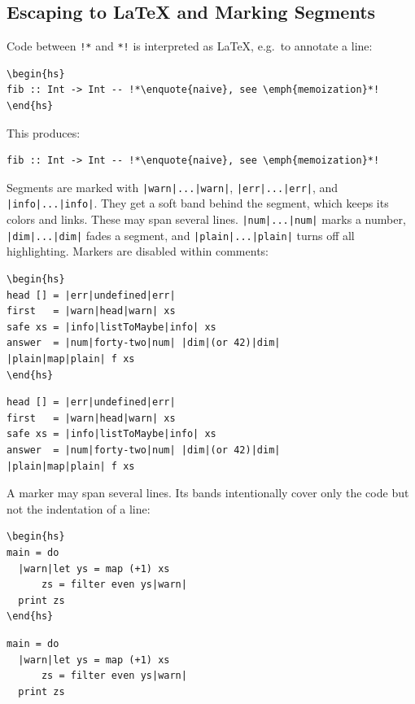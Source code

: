 \documentclass[10pt,DIV=12]{scrartcl}
\newcommand\code{\lstinline[language=lLatex,language addons=latex,basicstyle=\ttfamily,columns=flexible,keepspaces]}
\begin{document}
\subsection{Escaping to \LaTeX{} and Marking Segments}\label{sec:markers}
Code between \code|!*| and \code|*!| is interpreted as \LaTeX, e.g.\ to annotate a line:
\begin{verbatim}
\begin{hs}
fib :: Int -> Int -- !*\enquote{naive}, see \emph{memoization}*!
\end{hs}
\end{verbatim}
This produces:
\begin{verbatim}
fib :: Int -> Int -- !*\enquote{naive}, see \emph{memoization}*!
\end{verbatim}
Segments are marked with \code+|warn|...|warn|+, \code+|err|...|err|+, and
\code+|info|...|info|+. They get a soft band behind the segment, which keeps its colors and links. These may
span several lines. \code+|num|...|num|+ marks a number, \code+|dim|...|dim|+ fades a segment, and
\code+|plain|...|plain|+ turns off all highlighting. Markers are disabled within comments:
\begin{verbatim}
\begin{hs}
head [] = |err|undefined|err|
first   = |warn|head|warn| xs
safe xs = |info|listToMaybe|info| xs
answer  = |num|forty-two|num| |dim|(or 42)|dim|
|plain|map|plain| f xs
\end{hs}
\end{verbatim}
\begin{verbatim}
head [] = |err|undefined|err|
first   = |warn|head|warn| xs
safe xs = |info|listToMaybe|info| xs
answer  = |num|forty-two|num| |dim|(or 42)|dim|
|plain|map|plain| f xs
\end{verbatim}
A marker may span several lines. Its bands intentionally cover only the code but not the indentation of a line:
\begin{verbatim}
\begin{hs}
main = do
  |warn|let ys = map (+1) xs
      zs = filter even ys|warn|
  print zs
\end{hs}
\end{verbatim}
\begin{verbatim}
main = do
  |warn|let ys = map (+1) xs
      zs = filter even ys|warn|
  print zs
\end{verbatim}
\end{document}
